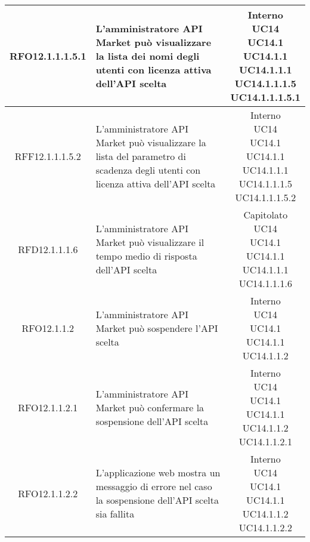 \begin{longtable}{|c|p{8cm}|c|}
\hypertarget{RFO12.1.1.1.5.1}{RFO12.1.1.1.5.1} & L'amministratore API Market può visualizzare la lista dei nomi degli utenti con licenza attiva dell'API scelta & \makecell*{Interno\\UC14\\UC14.1\\UC14.1.1\\UC14.1.1.1\\UC14.1.1.1.5\\UC14.1.1.1.5.1} \\
\hline
\hypertarget{RFF12.1.1.1.5.2}{RFF12.1.1.1.5.2} & L'amministratore API Market può visualizzare la lista del parametro di scadenza degli utenti con licenza attiva dell'API scelta & \makecell*{Interno\\UC14\\UC14.1\\UC14.1.1\\UC14.1.1.1\\UC14.1.1.1.5\\UC14.1.1.1.5.2} \\
\hline

\hypertarget{RFD12.1.1.1.6}{RFD12.1.1.1.6} & L'amministratore API Market può visualizzare il tempo medio di risposta dell'API scelta & \makecell*{Capitolato\\UC14\\UC14.1\\UC14.1.1\\UC14.1.1.1\\UC14.1.1.1.6} \\
\hline

\hypertarget{RFO12.1.1.2}{RFO12.1.1.2} & L'amministratore API Market può sospendere l'API scelta & \makecell*{Interno\\UC14\\UC14.1\\UC14.1.1\\UC14.1.1.2} \\
\hline

\hypertarget{RFO12.1.1.2.1}{RFO12.1.1.2.1} & L'amministratore API Market può confermare la sospensione dell'API scelta & \makecell*{Interno\\UC14\\UC14.1\\UC14.1.1\\UC14.1.1.2\\UC14.1.1.2.1} \\
\hline
\hypertarget{RFO12.1.1.2.2}{RFO12.1.1.2.2} & L'applicazione web mostra un messaggio di errore nel caso la sospensione dell'API scelta sia fallita & \makecell*{Interno\\UC14\\UC14.1\\UC14.1.1\\UC14.1.1.2\\UC14.1.1.2.2} \\
\hline


\end{longtable}
